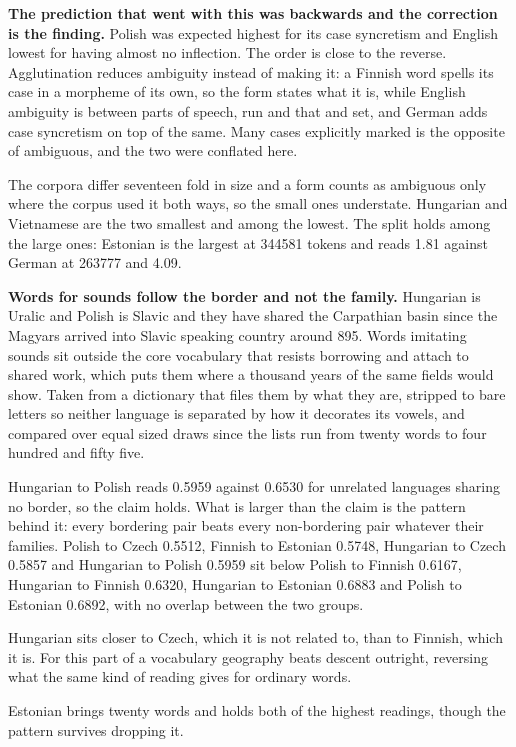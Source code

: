 \textbf{The prediction that went with this was backwards and the correction is the finding.} Polish was expected highest for its case syncretism and English lowest for having almost no inflection. The order is close to the reverse. Agglutination reduces ambiguity instead of making it: a Finnish word spells its case in a morpheme of its own, so the form states what it is, while English ambiguity is between parts of speech, run and that and set, and German adds case syncretism on top of the same. Many cases explicitly marked is the opposite of ambiguous, and the two were conflated here.

The corpora differ seventeen fold in size and a form counts as ambiguous only where the corpus used it both ways, so the small ones understate. Hungarian and Vietnamese are the two smallest and among the lowest. The split holds among the large ones: Estonian is the largest at 344581 tokens and reads 1.81 against German at 263777 and 4.09.

\textbf{Words for sounds follow the border and not the family.} Hungarian is Uralic and Polish is Slavic and they have shared the Carpathian basin since the Magyars arrived into Slavic speaking country around 895. Words imitating sounds sit outside the core vocabulary that resists borrowing and attach to shared work, which puts them where a thousand years of the same fields would show. Taken from a dictionary that files them by what they are, stripped to bare letters so neither language is separated by how it decorates its vowels, and compared over equal sized draws since the lists run from twenty words to four hundred and fifty five.

Hungarian to Polish reads 0.5959 against 0.6530 for unrelated languages sharing no border, so the claim holds. What is larger than the claim is the pattern behind it: every bordering pair beats every non-bordering pair whatever their families. Polish to Czech 0.5512, Finnish to Estonian 0.5748, Hungarian to Czech 0.5857 and Hungarian to Polish 0.5959 sit below Polish to Finnish 0.6167, Hungarian to Finnish 0.6320, Hungarian to Estonian 0.6883 and Polish to Estonian 0.6892, with no overlap between the two groups.

Hungarian sits closer to Czech, which it is not related to, than to Finnish, which it is. For this part of a vocabulary geography beats descent outright, reversing what the same kind of reading gives for ordinary words.

Estonian brings twenty words and holds both of the highest readings, though the pattern survives dropping it.

